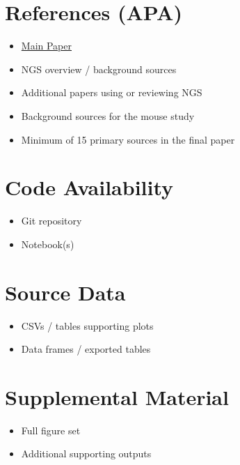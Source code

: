 \documentclass[12pt]{article}
\begin{document}
\section*{References (APA)}
\begin{itemize}
\item \href{https://www.nature.com/articles/s41586-026-10295-z\#code-availability}{Main Paper}
\item NGS overview / background sources
\item Additional papers using or reviewing NGS
\item Background sources for the mouse study
\item Minimum of 15 primary sources in the final paper
\end{itemize}
\section*{Code Availability}
\begin{itemize}
\item Git repository
\item Notebook(s)
\end{itemize}
\section*{Source Data}
\begin{itemize}
\item CSVs / tables supporting plots
\item Data frames / exported tables
\end{itemize}
\section*{Supplemental Material}
\begin{itemize}
\item Full figure set
\item Additional supporting outputs
\end{itemize}
\end{document}

